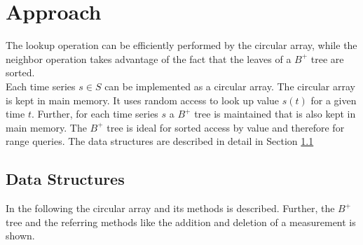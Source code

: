 \documentclass[abstracton,12pt]{scrreprt}
\begin{document}
\chapter{Approach}
\label{sec:Approach}
The lookup operation can be efficiently performed by the circular array, while the neighbor operation takes advantage of the fact that the leaves of a $B^+$ tree are sorted. \\
Each time series $s \in S$ can be implemented as a circular array. The circular array is kept in main memory. It uses random access to look up value $s(t)$ for a given time $t$. Further, for each time series $s$ a $B^+$ tree is maintained that is also kept in main memory. The $B^+$ tree is ideal for sorted access by value and therefore for range queries. The data structures are described in detail in Section \ref{dataStructures}

\section{Data Structures}
\label{dataStructures}

In the following the circular array and its methods is described. Further, the $B^+$ tree and the referring methods like the addition and deletion of a measurement is shown.  
\end{document}
